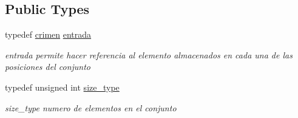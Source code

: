 \subsection*{Public Types}
\begin{DoxyCompactItemize}
\item 
\hypertarget{classconjunto_a09cad766dd65de73e51eae21f9d22585}{typedef \hyperlink{classcrimen}{crimen} \hyperlink{classconjunto_a09cad766dd65de73e51eae21f9d22585}{entrada}}\label{classconjunto_a09cad766dd65de73e51eae21f9d22585}

\begin{DoxyCompactList}\small\item\em entrada permite hacer referencia al elemento almacenados en cada una de las posiciones del conjunto \end{DoxyCompactList}\item 
\hypertarget{classconjunto_a855a5893bb0f5a851ab2dbf2b8aa6cc7}{typedef unsigned int \hyperlink{classconjunto_a855a5893bb0f5a851ab2dbf2b8aa6cc7}{size\-\_\-type}}\label{classconjunto_a855a5893bb0f5a851ab2dbf2b8aa6cc7}

\begin{DoxyCompactList}\small\item\em size\-\_\-type numero de elementos en el conjunto \end{DoxyCompactList}\end{DoxyCompactItemize}
